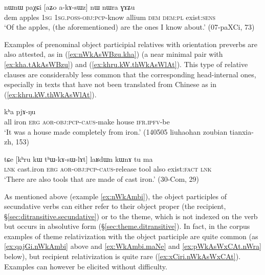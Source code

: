 \begin{exe}
\ex \label{ex:paXCi.akAsWz}
\gll   nɯnɯ paχɕi [aʑo a-kɤ-sɯz] nɯ nɯra ɣɤʑu \\
dem apples \textsc{1sg} \textsc{1sg}.\textsc{poss}-\textsc{obj}:\textsc{pcp}-know allium \textsc{dem} \textsc{dem}:\textsc{pl} exist:\textsc{sens} \\
\glt `Of the apples, (the aforementioned) are the ones I know about.' (07-paXCi, 73)
\end{exe}  

Examples of prenominal object participial relatives with orientation preverbs are also attested, as in (\ref{ex:nWkAsWBzu.kha}) (a near minimal pair with \ref{ex:kha.tAkAsWBzu}) and (\ref{ex:khru.kW.thWkAsWlAt}). This type of relative clauses are considerably less common that the corresponding head-internal ones, especially in texts that have not been translated from Chinese as in (\ref{ex:khru.kW.thWkAsWlAt}).

\begin{exe}
\ex \label{ex:nWkAsWBzu.kha}
 kʰa pjɤ-ŋu \\
all iron \textsc{erg} \textsc{aor}-\textsc{obj}:\textsc{pcp}-\textsc{caus}-make house \textsc{ifr}.\textsc{ipfv}-be \\
\glt `It was a house made completely from iron.' (140505 liuhaohan zoubian tianxia-zh, 153)
\end{exe}


\begin{exe}
\ex \label{ex:khru.kW.thWkAsWlAt}
\gll tɕe [kʰru kɯ tʰɯ-kɤ-sɯ-lɤt] laʁdɯn kɯnɤ tu ma\\
\textsc{lnk} cast.iron \textsc{erg} \textsc{aor}-\textsc{obj}:\textsc{pcp}-\textsc{caus}-release tool also exist:\textsc{fact} \textsc{lnk}\\
\glt `There are also tools that are made of cast iron.' (30-Com, 29)
\end{exe}

As mentioned above (example \ref{ex:nWkAmbi}), the object participles of secundative verbs can either refer to their object proper (the recipient, §\ref{sec:ditransitive.secundative}) or to the theme, which is not indexed on the verb but occurs in absolutive form (§\ref{sec:theme.ditransitive}). In fact, in the corpus examples of theme relativization with the object participle are quite common (as \ref{ex:qajGi.nWkAmbi} above and \ref{ex:WkAmbi.maNe} and \ref{ex:pWkAsWxCAt.nWra} below), but recipient relativization is quite rare (\ref{ex:xCiri.nWkAsWxCAt}). Examples can however be elicited without difficulty.

